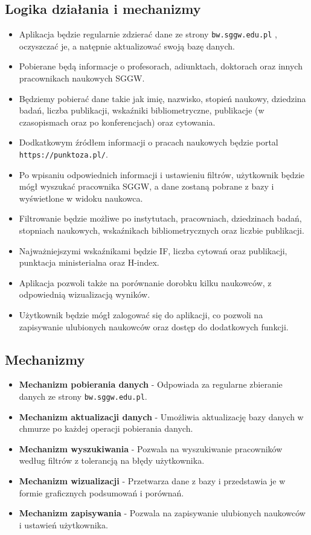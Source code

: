 \documentclass{article}
\begin{document}
\subsection{Logika działania i mechanizmy}
\begin{itemize}
  \item Aplikacja będzie regularnie zdzierać dane ze strony \texttt{bw.sggw.edu.pl} , oczyszczać je, a natępnie aktualizować swoją bazę danych.
  \item Pobierane będą informacje o profesorach, adiunktach, doktorach oraz innych pracownikach naukowych SGGW.
  \item Będziemy pobierać dane takie jak imię, nazwisko, stopień naukowy, dziedzina badań, liczba publikacji, wskaźniki bibliometryczne, publikacje (w czasopismach oraz po konferencjach) oraz cytowania.
  \item Dodkatkowym źródłem informacji o pracach naukowych będzie portal \texttt{https://punktoza.pl/}.
  \item Po wpisaniu odpowiednich informacji i ustawieniu filtrów, użytkownik będzie mógł wyszukać pracownika SGGW, a dane zostaną pobrane z bazy i wyświetlone w widoku naukowca.
  \item Filtrowanie będzie możliwe po instytutach, pracowniach, dziedzinach badań, stopniach naukowych, wskaźnikach bibliometrycznych oraz liczbie publikacji.
  \item Najważniejszymi wskaźnikami będzie IF, liczba cytowań oraz publikacji, punktacja ministerialna oraz H-index.
  \item Aplikacja pozwoli także na porównanie dorobku kilku naukowców, z odpowiednią wizualizacją wyników.
  \item Użytkownik będzie mógł zalogować się do aplikacji, co pozwoli na zapisywanie ulubionych naukowców oraz dostęp do dodatkowych funkcji.
\end{itemize}

\subsection{Mechanizmy}
\begin{itemize}
  \item \textbf{Mechanizm pobierania danych} - Odpowiada za regularne zbieranie danych ze strony \texttt{bw.sggw.edu.pl}.
  \item \textbf{Mechanizm aktualizacji danych} - Umożliwia aktualizację bazy danych w chmurze po każdej operacji pobierania danych.
  \item \textbf{Mechanizm wyszukiwania} - Pozwala na wyszukiwanie pracowników według filtrów z tolerancją na błędy użytkownika.
  \item \textbf{Mechanizm wizualizacji} - Przetwarza dane z bazy i przedstawia je w formie graficznych podsumowań i porównań.
  \item \textbf{Mechanizm zapisywania} - Pozwala na zapisywanie ulubionych naukowców i ustawień użytkownika.
\end{itemize}
\end{document}
